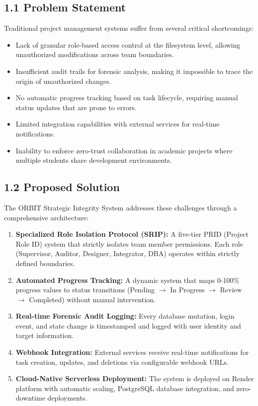 ﻿\documentclass[12pt]{article}
\begin{document}
\subsection*{1.1 Problem Statement}
Traditional project management systems suffer from several critical shortcomings:
\begin{itemize}
\item Lack of granular role-based access control at the filesystem level, allowing unauthorized modifications across team boundaries.
\item Insufficient audit trails for forensic analysis, making it impossible to trace the origin of unauthorized changes.
\item No automatic progress tracking based on task lifecycle, requiring manual status updates that are prone to errors.
\item Limited integration capabilities with external services for real-time notifications.
\item Inability to enforce zero-trust collaboration in academic projects where multiple students share development environments.
\end{itemize}

\subsection*{1.2 Proposed Solution}
The {\color{accent}ORBIT Strategic Integrity System} addresses these challenges through a comprehensive architecture:
\begin{enumerate}
\item \textbf{Specialized Role Isolation Protocol (SRIP):} A five-tier PRID (Project Role ID) system that strictly isolates team member permissions. Each role (Supervisor, Auditor, Designer, Integrator, DBA) operates within strictly defined boundaries.
\item \textbf{Automated Progress Tracking:} A dynamic system that maps 0-100\% progress values to status transitions (Pending $\rightarrow$ In Progress $\rightarrow$ Review $\rightarrow$ Completed) without manual intervention.
\item \textbf{Real-time Forensic Audit Logging:} Every database mutation, login event, and state change is timestamped and logged with user identity and target information.
\item \textbf{Webhook Integration:} External services receive real-time notifications for task creation, updates, and deletions via configurable webhook URLs.
\item \textbf{Cloud-Native Serverless Deployment:} The system is deployed on Render platform with automatic scaling, PostgreSQL database integration, and zero-downtime deployments.
\end{enumerate}
\end{document}
